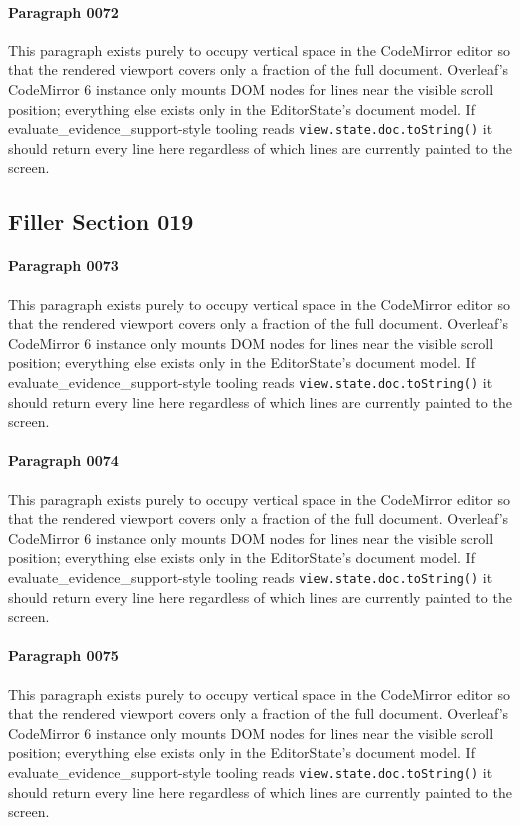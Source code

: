 \documentclass{article}
\begin{document}
\paragraph{Paragraph 0072}
This paragraph exists purely to occupy vertical space in the CodeMirror editor so that the rendered viewport covers only a fraction of the full document. Overleaf's CodeMirror 6 instance only mounts DOM nodes for lines near the visible scroll position; everything else exists only in the EditorState's document model. If evaluate\_evidence\_support-style tooling reads \texttt{view.state.doc.toString()} it should return every line here regardless of which lines are currently painted to the screen.

\subsection{Filler Section 019}
\paragraph{Paragraph 0073}
This paragraph exists purely to occupy vertical space in the CodeMirror editor so that the rendered viewport covers only a fraction of the full document. Overleaf's CodeMirror 6 instance only mounts DOM nodes for lines near the visible scroll position; everything else exists only in the EditorState's document model. If evaluate\_evidence\_support-style tooling reads \texttt{view.state.doc.toString()} it should return every line here regardless of which lines are currently painted to the screen.

\paragraph{Paragraph 0074}
This paragraph exists purely to occupy vertical space in the CodeMirror editor so that the rendered viewport covers only a fraction of the full document. Overleaf's CodeMirror 6 instance only mounts DOM nodes for lines near the visible scroll position; everything else exists only in the EditorState's document model. If evaluate\_evidence\_support-style tooling reads \texttt{view.state.doc.toString()} it should return every line here regardless of which lines are currently painted to the screen.

\paragraph{Paragraph 0075}
This paragraph exists purely to occupy vertical space in the CodeMirror editor so that the rendered viewport covers only a fraction of the full document. Overleaf's CodeMirror 6 instance only mounts DOM nodes for lines near the visible scroll position; everything else exists only in the EditorState's document model. If evaluate\_evidence\_support-style tooling reads \texttt{view.state.doc.toString()} it should return every line here regardless of which lines are currently painted to the screen.
\end{document}
